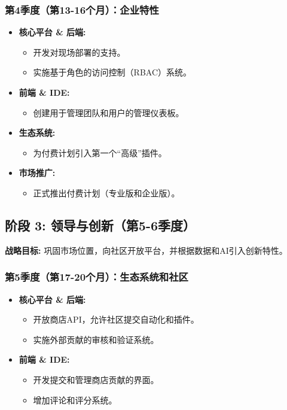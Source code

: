 \documentclass[11pt, a4paper, oneside]{article}
\begin{document}
\subsubsection*{第4季度（第13-16个月）：企业特性}
\begin{itemize}[leftmargin=*]
    \item \textbf{核心平台 \& 后端:}
    \begin{itemize}
        \item 开发对现场部署的支持。
        \item 实施基于角色的访问控制（RBAC）系统。
    \end{itemize}
    \item \textbf{前端 \& IDE:}
    \begin{itemize}
        \item 创建用于管理团队和用户的管理仪表板。
    \end{itemize}
    \item \textbf{生态系统:}
    \begin{itemize}
        \item 为付费计划引入第一个“高级”插件。
    \end{itemize}
    \item \textbf{市场推广:}
    \begin{itemize}
        \item 正式推出付费计划（专业版和企业版）。
    \end{itemize}
\end{itemize}

\clearpage

\subsection{阶段 3: 领导与创新（第5-6季度）}
\textbf{战略目标:} 巩固市场位置，向社区开放平台，并根据数据和AI引入创新特性。

\subsubsection*{第5季度（第17-20个月）：生态系统和社区}
\begin{itemize}[leftmargin=*]
    \item \textbf{核心平台 \& 后端:}
    \begin{itemize}
        \item 开放商店API，允许社区提交自动化和插件。
        \item 实施外部贡献的审核和验证系统。
    \end{itemize}
    \item \textbf{前端 \& IDE:}
    \begin{itemize}
        \item 开发提交和管理商店贡献的界面。
        \item 增加评论和评分系统。
    \end{itemize}
\end{itemize}
\end{document}
